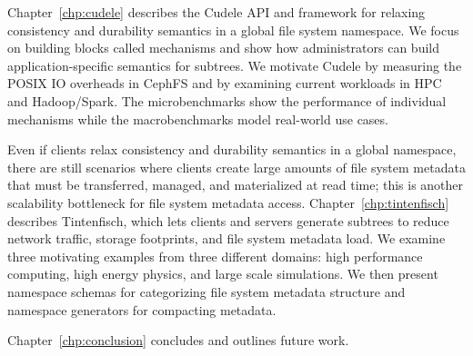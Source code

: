 Chapter~\ref{chp:cudele} describes the Cudele API and framework for relaxing
consistency and durability semantics in a global file system namespace. We
focus on building blocks called mechanisms and show how administrators can
build application-specific semantics for subtrees.  We motivate Cudele by
measuring the POSIX IO overheads in CephFS and by examining current workloads
in HPC and Hadoop/Spark. The microbenchmarks show the performance of individual
mechanisms while the macrobenchmarks model real-world use cases.

Even if clients relax consistency and durability semantics in a global
namespace, there are still scenarios where clients create large amounts of file
system metadata that must be transferred, managed, and materialized at read
time; this is another scalability bottleneck for file system metadata access.
Chapter~\ref{chp:tintenfisch} describes Tintenfisch, which lets clients and
servers generate subtrees to reduce network traffic, storage footprints, and
file system metadata load. We examine three motivating examples from three
different domains: high performance computing, high energy physics, and large
scale simulations. We then present namespace schemas for categorizing file
system metadata structure and namespace generators for compacting metadata.

Chapter~\ref{chp:conclusion} concludes and outlines future work.

